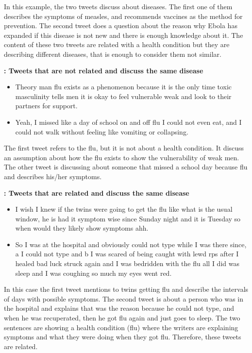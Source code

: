 \documentclass[12pt]{report}
\begin{document}
In this example, the two tweets discuss about diseases. The first one of them describes the symptoms of measles, and recommends vaccines as the method
for  prevention. The second tweet does a question about the reason why Ebola has expanded if this disease is not new and there is enough knowledge about it. The content of these two tweets are related with a health condition but they are describing different diseases, that is enough to consider them not similar.

\begin{definition} {\bf : Tweets that are not related and discuss the same disease}
	\begin{itemize}[nolistsep]
		\item Theory man flu exists as a phenomenon because it is the only time toxic masculinity tells men it is okay to feel vulnerable weak and look to their partners for support.
		\item Yeah, I missed like a day of school on and off flu I could not even eat, and I could not walk without feeling like vomiting or collapsing.
	\end{itemize}
\end{definition}

The first tweet refers to the flu, but it is not about a health condition. It discuss  an assumption about how the flu exists to show the vulnerability of weak  men. The  other tweet is discussing about someone that missed a school day because flu and describes  his/her symptoms.


\begin{definition} {\bf : Tweets that are  related  and discuss the same disease}
	\begin{itemize}[nolistsep]
		\item I wish I knew if the twins were going to get the flu like what is the usual window, he is had it symptom wise since Sunday night and it is Tuesday so when would they likely show symptoms ahh.
		\item So I was at the hospital and obviously could not type while I was there since, a I could not type and b I was scared of being caught with lewd rps after I healed bad luck struck again and I was bedridden with the flu all I did was sleep and I was coughing so much my eyes went red.
	\end{itemize}
\end{definition}

In this case the first tweet mentions to twins getting flu and describe the intervals of days with possible symptoms. The second tweet is about a person who was in the hospital and explains that was the reason because he could not type, and when he was recuperated, then he got flu again and just goes to sleep. The two sentences are showing a health condition (flu) where the writers are explaining symptoms and what they were doing when they got flu. Therefore, these tweets are related.
\end{document}
